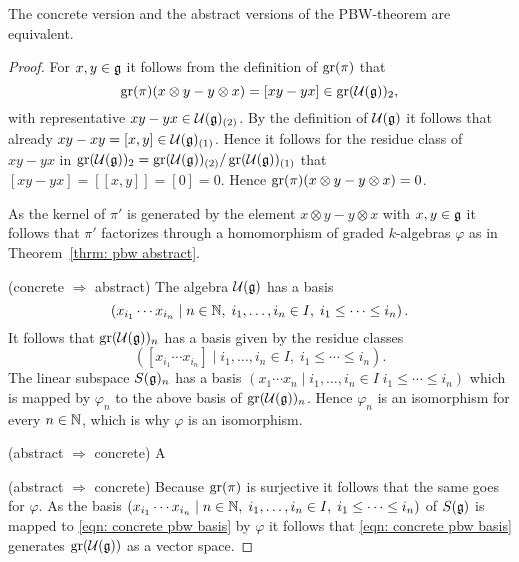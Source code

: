 \begin{prop}
 The concrete version and the abstract versions of the PBW-theorem are equivalent.
\end{prop}
\begin{proof}
 For $x, y \in \mathfrak{g}$ it follows from the definition of $\operatorname{gr}(\pi)$ that
 \[
  \operatorname{gr}(\pi)(x \otimes y - y \otimes x) = [xy-yx] \in \operatorname{gr}(\mathcal{U}(\mathfrak{g}))_2,
 \]
 with representative $xy-yx \in \mathcal{U}(\mathfrak{g})_{(2)}$. By the definition of $\mathcal{U}(\mathfrak{g})$ it follows that already \mbox{$xy-xy = [x,y] \in \mathcal{U}(\mathfrak{g})_{(1)}$}. Hence it follows for the residue class of $xy-yx$ in $\operatorname{gr}(\mathcal{U}(\mathfrak{g}))_2 = \operatorname{gr}(\mathcal{U}(\mathfrak{g}))_{(2)}/\operatorname{gr}(\mathcal{U}(\mathfrak{g}))_{(1)}$ that $[xy-yx] = [[x,y]] = [0] = 0$. Hence $\operatorname{gr}(\pi)(x \otimes y - y \otimes x) = 0$.
 
 As the kernel of $\pi'$ is generated by the element $x \otimes y - y \otimes x$ with $x,y \in \mathfrak{g}$ it follows that $\pi'$ factorizes through a homomorphism of graded $k$-algebras $\varphi$ as in Theorem~\ref{thrm: pbw abstract}.
 
 (concrete $\Rightarrow$ abstract) The algebra $\mathcal{U}(\mathfrak{g})$ has a basis
 \[
  \left(
   x_{i_1} \dotsm x_{i_n}
  \mid
   n \in \mathbb{N}, \;
   i_1, \dotsc, i_n \in I, \;
   i_1 \leq \dotsb \leq i_n
  \right).
 \]
 It follows that $\operatorname{gr}(\mathcal{U}(\mathfrak{g}))_n$ has a basis given by the residue classes
 \[
  \left(
   [x_{i_1} \dotsm x_{i_n}]
  \mid
   i_1, \dotsc, i_n \in I, \;
   i_1 \leq \dotsb \leq i_n
  \right).
 \]
 The linear subspace $S(\mathfrak{g})_n$ has a basis $(x_1 \dotsm x_n \mid i_1, \dotsc, i_n \in I \; i_1 \leq \dotsb \leq i_n)$ which is mapped by $\varphi_n$ to the above basis of $\operatorname{gr}(\mathcal{U}(\mathfrak{g}))_n$. Hence $\varphi_n$ is an isomorphism for every $n \in \mathbb{N}$, which is why $\varphi$ is an isomorphism.
 
 (abstract $\Rightarrow$ concrete) A
 
 (abstract $\Rightarrow$ concrete) Because $\operatorname{gr}(\pi)$ is surjective it follows that the same goes for $\varphi$. As the basis $(x_{i_1} \dotsm x_{i_n} \mid n \in \mathbb{N}, \; i_1, \dotsc, i_n \in I, \; i_1 \leq \dotsb \leq i_n)$ of $S(\mathfrak{g})$ is mapped to \eqref{eqn: concrete pbw basis} by $\varphi$ it follows that \eqref{eqn: concrete pbw basis} generates $\operatorname{gr}(\mathcal{U}(\mathfrak{g}))$ as a vector space.
\end{proof}






























